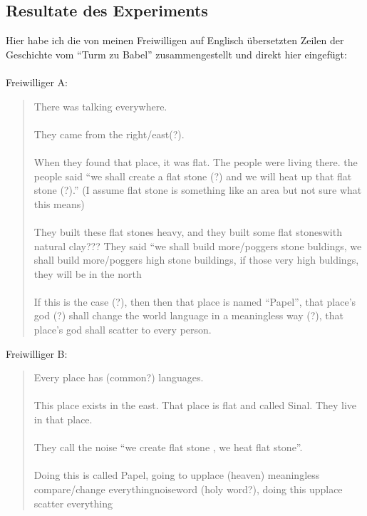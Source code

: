 \documentclass{article}
\begin{document}
\subsection{Resultate des Experiments}
Hier habe ich die von meinen Freiwilligen auf Englisch übersetzten Zeilen der Geschichte vom ``Turm zu Babel''
zusammengestellt und direkt hier eingefügt:
\\
\\
\noindent
Freiwilliger A:
\begin{quotation}
    \noindent
    There was talking everywhere.
    \\
    \\
    \noindent
    They came from the right/east(?).
    \\
    \\
    \noindent
    When they found that place, it was flat. The people were living there.
    the people said ``we shall create a flat stone (?) and we will heat up that flat stone (?).''
    (I assume flat stone is something like an area but not sure what this means)
    \\
    \\
    \noindent
    They built these flat stones heavy, and they built some flat stoneswith natural clay???
    They said ``we shall build more/poggers stone buldings, we shall build more/poggers high stone buildings,
    if those very high buldings, they will be in the north
    \\
    \\
    \noindent
    If this is the case (?), then then that place is named ``Papel'',
    that place's god (?) shall change the world language in a meaningless way (?),
    that place's god shall scatter to every person.
\end{quotation}

\newpage
\noindent
Freiwilliger B:
\begin{quotation}
    \noindent
    Every place has (common?) languages.
    \\
    \\
    \noindent
    This place exists in the east. That place is flat and called Sinal. They live in that place.
    \\
    \\
    \noindent
    They call the noise ``we create flat stone , we heat flat stone''.
    \\
    \\
    \noindent
    Doing this is called Papel, going to upplace (heaven) meaningless
    compare/change everythingnoiseword (holy word?), doing this upplace scatter everything
\end{quotation}
\end{document}
